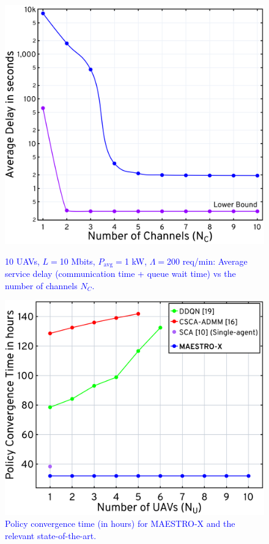 \documentclass[12pt, draftcls, onecolumn]{IEEEtran}
\theoremstyle{plain}
\theoremstyle{definition}
\theoremstyle{remark}
\newcommand\hlt[1]{\textcolor{blue}{#1}}
\begin{document}
\begin{figure}[t]
	\begin{minipage}[b]{0.47\linewidth}
	\centering
	\includegraphics[width=0.95\linewidth]{figs/Delay_NC_10_UAVs.jpg}
    \vspace{-2mm}
	\caption{\hlt{10 UAVs, $L{=}$10 Mbits, $P_{\mathrm{avg}}{=}$1 kW, $\Lambda{=}$200 req/min: Average service delay (communication time + queue wait time) vs the number of channels $N_{C}$.}}
	\label{F10a}
\end{minipage}
\hfill
\begin{minipage}[b]{0.485\linewidth}
	\centering
	\includegraphics[width=1.0\linewidth]{figs/Policy_Convergence.jpg}
    \vspace{-2mm}
	\caption{\hlt{Policy convergence time (in hours) for MAESTRO-X and the relevant state-of-the-art.}}
	\label{F10}
\end{minipage}
\end{figure}
\vspace{-4mm}
\end{document}
